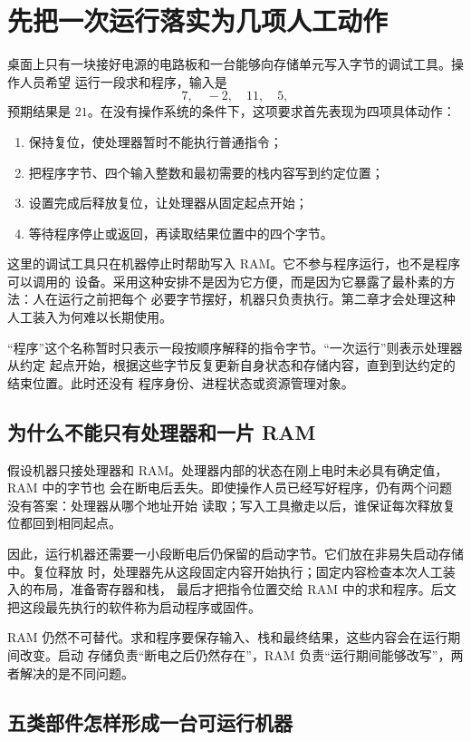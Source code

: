 \section{先把一次运行落实为几项人工动作}

桌面上只有一块接好电源的电路板和一台能够向存储单元写入字节的调试工具。操作人员希望
运行一段求和程序，输入是
\[
7,\quad -2,\quad 11,\quad 5,
\]
预期结果是 \(21\)。在没有操作系统的条件下，这项要求首先表现为四项具体动作：

\begin{enumerate}
\item 保持复位，使处理器暂时不能执行普通指令；
\item 把程序字节、四个输入整数和最初需要的栈内容写到约定位置；
\item 设置完成后释放复位，让处理器从固定起点开始；
\item 等待程序停止或返回，再读取结果位置中的四个字节。
\end{enumerate}

这里的调试工具只在机器停止时帮助写入 RAM。它不参与程序运行，也不是程序可以调用的
设备。采用这种安排不是因为它方便，而是因为它暴露了最朴素的方法：人在运行之前把每个
必要字节摆好，机器只负责执行。第二章才会处理这种人工装入为何难以长期使用。

“程序”这个名称暂时只表示一段按顺序解释的指令字节。“一次运行”则表示处理器从约定
起点开始，根据这些字节反复更新自身状态和存储内容，直到到达约定的结束位置。此时还没有
程序身份、进程状态或资源管理对象。

\subsection{为什么不能只有处理器和一片 RAM}

假设机器只接处理器和 RAM。处理器内部的状态在刚上电时未必具有确定值，RAM 中的字节也
会在断电后丢失。即使操作人员已经写好程序，仍有两个问题没有答案：处理器从哪个地址开始
读取；写入工具撤走以后，谁保证每次释放复位都回到相同起点。

因此，运行机器还需要一小段断电后仍保留的启动字节。它们放在非易失启动存储中。复位释放
时，处理器先从这段固定内容开始执行；固定内容检查本次人工装入的布局，准备寄存器和栈，
最后才把指令位置交给 RAM 中的求和程序。后文把这段最先执行的软件称为启动程序或固件。

RAM 仍然不可替代。求和程序要保存输入、栈和最终结果，这些内容会在运行期间改变。启动
存储负责“断电之后仍然存在”，RAM 负责“运行期间能够改写”，两者解决的是不同问题。

\subsection{五类部件怎样形成一台可运行机器}

